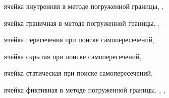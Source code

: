 ячейка внутренняя в методе погруженной границы, \pageref{term:cell_ibm_innner}, \pageref{term:cell_ibm_innner2}

ячейка граничная в методе погруженной границы, \pageref{term:cell_ibm_border}, \pageref{term:cell_ibm_border2}

ячейка пересечения при поиске самопересечений, \pageref{term:cell_intersect}

ячейка скрытая при поиске самопересечений, \pageref{term:cell_hidden}

ячейка статическая при поиске самопересечений, \pageref{term:cell_static}

ячейка фиктивная в методе погруженной границы, \pageref{term:cell_ibm_ghost}, \pageref{term:cell_ibm_ghost2}, \pageref{term:cell_ibm_ghost3}
